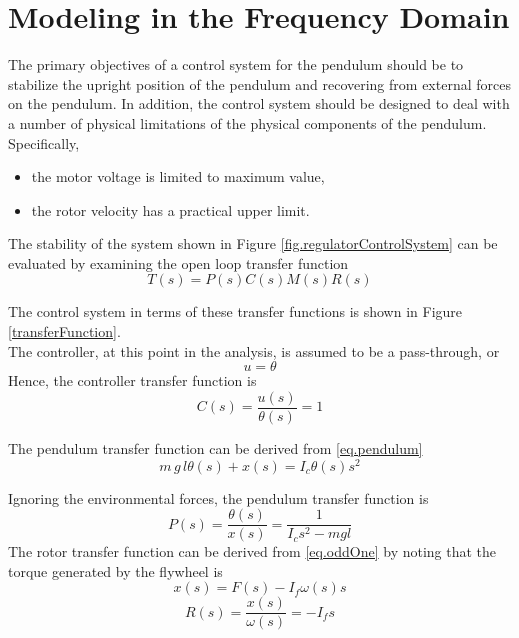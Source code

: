 \documentclass[12pt,letterpaper]{article}
\begin{document}
\section{Modeling in the Frequency Domain}
\label{sec:Modeling}

The primary objectives of a control system for the pendulum should be to stabilize the upright position of the pendulum and recovering from external forces on the pendulum.  In addition, the control system should be designed to deal with a number
of physical limitations of the physical components of the pendulum.  Specifically,
\begin{itemize}
    \item the motor voltage is limited to maximum value,
    \item the rotor velocity has a practical upper limit.
\end{itemize}


The stability of the system shown in Figure  \ref{fig.regulatorControlSystem} can be evaluated by examining the
open loop transfer function
\begin{equation}
    T(s) = P(s) C(s) M(s) R(s)
\end{equation}



The control system in terms of these transfer functions is shown in Figure \ref{transferFunction}.\\


The controller, at this point in the analysis, is assumed to be a pass-through, or
%
\begin{equation}
u = \theta
\end{equation}
Hence, the controller transfer function is
\begin{equation}
C(s) = \frac{u(s)}{\theta(s)} = 1
    \label{EQ.simpleController}
\end{equation}

The pendulum transfer function can be derived from \eqref{eq.pendulum}
%
\begin{equation}
    m \,g \,l \theta(s) + x(s) = I_{c}\theta(s) s^{2}
\end{equation}

Ignoring the environmental forces, the pendulum transfer function is 
\begin{equation}
    P(s) = \frac{\theta(s)}{x(s)}= \frac{1}{I_{c} s^{2} - m g l }
    \label{franco}
\end{equation}
%
The rotor transfer function can be derived from \eqref{eq.oddOne} by noting that the torque generated by the flywheel is
\begin{equation}
    x(s) = F(s) - I_{f}\omega(s) s
\end{equation}
%
\begin{equation}
    R(s) = \frac{x(s)}{\omega(s)} = -I_{f} s
    \label{groucho}
\end{equation}\\
\end{document}
